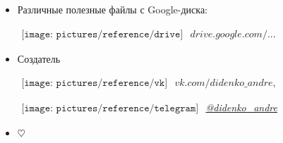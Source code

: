 \begin{itemize}
\item
Различные полезные файлы с Google-диска:

$
\begin{array}{l}
\texttt{[image: pictures/reference/drive]}
\end{array}
$
\href{https://drive.google.com/drive/u/0/folders/0BzuzEyNkpwYDYjVNcE0wa3hqWjA}{$drive.google.com/...$}

\item
Создатель

$
\begin{array}{l}
\texttt{[image: pictures/reference/vk]}
\end{array}
$
\href{https://vk.com/didenko_andre}{ \textcolor{Purplemountainmajesty}{$vk.com/didenko\_andre$}},

$
\begin{array}{l}
\texttt{[image: pictures/reference/telegram]}
\end{array}
$
\href{https://telegram.me/didenko_andre}{ \textcolor{Purplemountainmajesty}{\textit{@didenko_andre}}}

\item

$\heartsuit$
\end{itemize}

